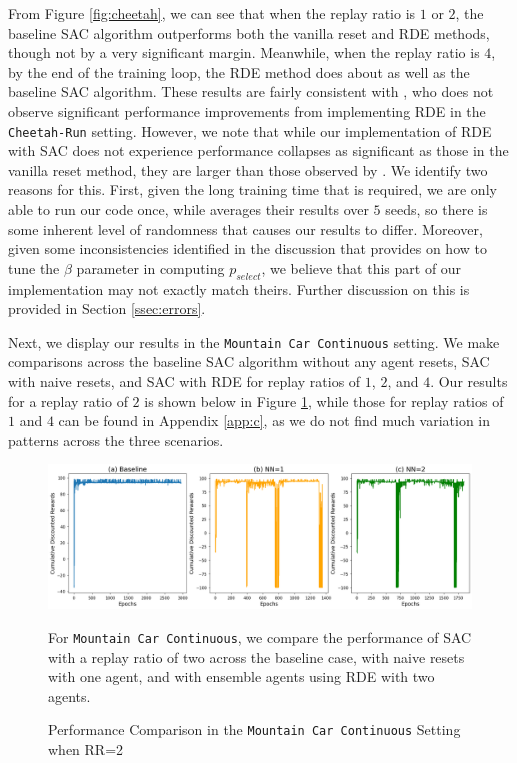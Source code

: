 \documentclass[base]{subfiles}
\begin{document}
From Figure \ref{fig:cheetah}, we can see that when the replay ratio is $1$ or $2$, the baseline SAC algorithm outperforms both the vanilla reset and RDE methods, though not by a very significant margin.
Meanwhile, when the replay ratio is $4$, by the end of the training loop, the RDE method does about as well as the baseline SAC algorithm.
These results are fairly consistent with \cite{kim2023}, who does not observe significant performance improvements from implementing RDE in the \texttt{Cheetah-Run} setting.
However, we note that while our implementation of RDE with SAC does not experience performance collapses as significant as those in the vanilla reset method, they are larger than those observed by \cite{kim2023}.
We identify two reasons for this.
First, given the long training time that is required, we are only able to run our code once, while \cite{kim2023} averages their results over $5$ seeds, so there is some inherent level of randomness that causes our results to differ.
Moreover, given some inconsistencies identified in the discussion that \cite{kim2023} provides on how to tune the $\beta$ parameter in computing $p_{select}$, we believe that this part of our implementation may not exactly match theirs.
Further discussion on this is provided in Section \ref{ssec:errors}.

Next, we display our results in the \texttt{Mountain Car Continuous} setting. 
We make comparisons across the baseline SAC algorithm without any agent resets, SAC with naive resets, and SAC with RDE for replay ratios of $1$, $2$, and $4$.
Our results for a replay ratio of $2$ is shown below in Figure \ref{fig:mc_rr2}, while those for replay ratios of $1$ and $4$ can be found in Appendix \ref{app:c}, as we do not find much variation in patterns across the three scenarios.

\begin{figure}[h!]
    \centering
    \caption{Performance Comparison in the \texttt{Mountain Car Continuous} Setting when RR=2}
    \label{fig:mc_rr2}
    \includegraphics[width = 1 \linewidth]{mc_RR2.png}
    \begin{flushleft} For \texttt{Mountain Car Continuous}, we compare the performance of SAC with a replay ratio of two across the baseline case, with naive resets with one agent, and with ensemble agents using RDE with two agents. \end{flushleft}
\end{figure}
\end{document}
